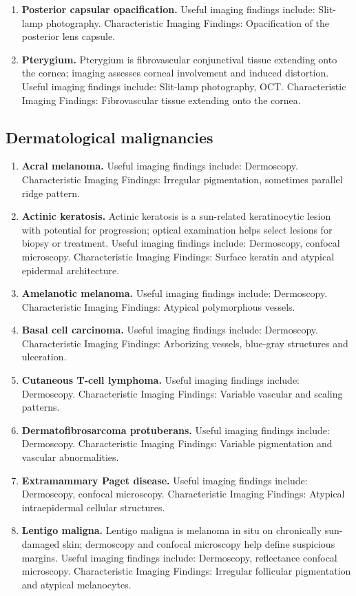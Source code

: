 \begin{enumerate}[leftmargin=*,itemsep=0.45em,topsep=0.4em]
\item \textbf{Posterior capsular opacification.} Useful imaging findings include: Slit-lamp photography. Characteristic Imaging Findings: Opacification of the posterior lens capsule.
\item \textbf{Pterygium.} Pterygium is fibrovascular conjunctival tissue extending onto the cornea; imaging assesses corneal involvement and induced distortion. Useful imaging findings include: Slit-lamp photography, OCT. Characteristic Imaging Findings: Fibrovascular tissue extending onto the cornea.
\end{enumerate}

\subsection{Dermatological malignancies}
\begin{enumerate}[leftmargin=*,itemsep=0.45em,topsep=0.4em]
\item \textbf{Acral melanoma.} Useful imaging findings include: Dermoscopy. Characteristic Imaging Findings: Irregular pigmentation, sometimes parallel ridge pattern.
\item \textbf{Actinic keratosis.} Actinic keratosis is a sun-related keratinocytic lesion with potential for progression; optical examination helps select lesions for biopsy or treatment. Useful imaging findings include: Dermoscopy, confocal microscopy. Characteristic Imaging Findings: Surface keratin and atypical epidermal architecture.
\item \textbf{Amelanotic melanoma.} Useful imaging findings include: Dermoscopy. Characteristic Imaging Findings: Atypical polymorphous vessels.
\item \textbf{Basal cell carcinoma.} Useful imaging findings include: Dermoscopy. Characteristic Imaging Findings: Arborizing vessels, blue-gray structures and ulceration.
\item \textbf{Cutaneous T-cell lymphoma.} Useful imaging findings include: Dermoscopy. Characteristic Imaging Findings: Variable vascular and scaling patterns.
\item \textbf{Dermatofibrosarcoma protuberans.} Useful imaging findings include: Dermoscopy. Characteristic Imaging Findings: Variable pigmentation and vascular abnormalities.
\item \textbf{Extramammary Paget disease.} Useful imaging findings include: Dermoscopy, confocal microscopy. Characteristic Imaging Findings: Atypical intraepidermal cellular structures.
\item \textbf{Lentigo maligna.} Lentigo maligna is melanoma in situ on chronically sun-damaged skin; dermoscopy and confocal microscopy help define suspicious margins. Useful imaging findings include: Dermoscopy, reflectance confocal microscopy. Characteristic Imaging Findings: Irregular follicular pigmentation and atypical melanocytes.

\end{enumerate}
